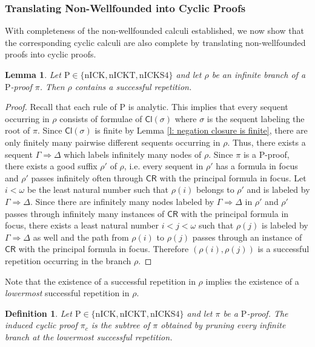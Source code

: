 \documentclass{myifcolog}
\newcommand\C {C}
\newcommand\Cl {\mathsf{Cl}}
\newcommand{\hickp}{\mathrm{P}}
\newcommand{\nick}{\mathrm{nICK}}
\newcommand{\nickt}{\mathrm{nICKT}}
\newcommand{\nicks}{\mathrm{nICKS4}}
\newtheorem{definition}[theorem]{Definition}
\newtheorem{lemma}[theorem]{Lemma}
\numberwithin{theorem}{section}
\begin{document}
\subsubsection{Translating Non-Wellfounded into Cyclic Proofs}\label{ss: translating non-wellfounded into cyclic proofs}

With completeness of the non-wellfounded calculi established, we now show that the corresponding cyclic calculi are also complete by translating non-wellfounded proofs into cyclic proofs. 


\begin{lemma}\label{l: infinite branches contain good repetitions}
    Let $\hickp \in \{\nick, \nickt, \nicks\}$ and let $\rho$ be an infinite branch of a $\hickp$-proof $\pi$. Then $\rho$ contains a successful repetition.
\end{lemma}
\begin{proof}
    Recall that each rule of $\hickp$ is analytic. This implies that every sequent occurring in $\rho$ consists of formulae of $\Cl(\sigma)$ where $\sigma$ is the sequent labeling the root of $\pi$. Since $\Cl(\sigma)$ is finite by Lemma \ref{l: negation closure is finite}, there are only finitely many pairwise different sequents occurring in $\rho$. Thus, there exists a sequent $\Gamma \Rightarrow \Delta$ which labels infinitely many nodes of $\rho$. Since $\pi$ is a $\hickp$-proof, there exists a good suffix $\rho'$ of $\rho$, i.e. every sequent in $\rho'$ has a formula in focus and $\rho'$ passes infinitely often through $\mathsf{\C R}$ with the principal formula in focus. Let $i < \omega$ be the least natural number such that $\rho(i)$ belongs to $\rho'$ and is labeled by $\Gamma \Rightarrow \Delta$. Since there are infinitely many nodes labeled by $\Gamma \Rightarrow \Delta$ in $\rho'$ and $\rho'$ passes through infinitely many instances of $ \mathsf{\C R}$ with the principal formula in focus, there exists a least natural number $i < j < \omega$ such that $\rho(j)$ is labeled by $\Gamma \Rightarrow \Delta$ as well and the path from $\rho(i)$ to $\rho(j)$ passes through an instance of $ \mathsf{\C R}$ with the principal formula in focus. Therefore $(\rho(i), \rho(j))$ is a successful repetition occurring in the branch $\rho$.
\end{proof}

Note that the existence of a successful repetition in $\rho$ implies the existence of a \emph{lowermost} successful repetition in $\rho$.

\begin{definition}
    Let $\hickp \in \{\nick, \nickt, \nicks\}$ and let $\pi$ be a $\hickp$-proof. The \emph{induced cyclic proof} $\pi_c$ is the subtree of $\pi$ obtained by pruning every infinite branch at the lowermost successful repetition.
\end{definition}
\end{document}
